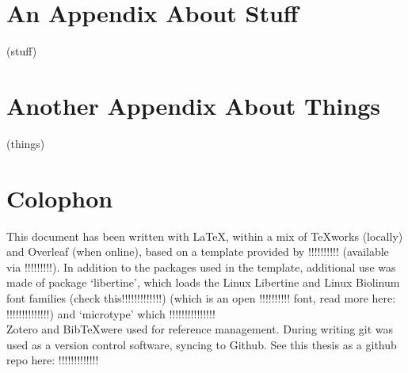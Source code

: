 
\appendix
\chapter{An Appendix About Stuff}
\label{appendixlabel1}
(stuff)

\chapter{Another Appendix About Things}
\label{appendixlabel2}
(things)

\chapter{Colophon}
\label{appendixlabel3}

This document has been written with \LaTeX, within a mix of TeXworks (locally) and Overleaf (when online), based on a template provided by !!!!!!!!!! (available via !!!!!!!!!).
In addition to the packages used in the template, additional use was made of package `libertine', which loads the Linux Libertine and Linux Biolinum font families (check this!!!!!!!!!!!!!) (which is an open !!!!!!!!!! font, read more here: !!!!!!!!!!!!!!) and `microtype' which !!!!!!!!!!!!!!! \\
Zotero and Bib\TeX were used for reference management.
During writing git was used as a version control software, syncing to Github. See this thesis as a github repo here: !!!!!!!!!!!!!

%

